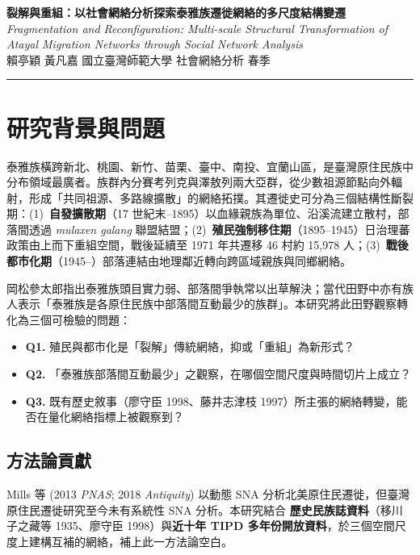 \documentclass[11pt,a4paper]{article}
\title{}
\author{}
\date{}
\begin{document}
\begin{center}
  {\LARGE\bfseries 裂解與重組：以社會網絡分析探索泰雅族遷徙網絡的多尺度結構變遷}\\[4pt]
  {\small\itshape Fragmentation and Reconfiguration: Multi-scale Structural Transformation of\\Atayal Migration Networks through Social Network Analysis}\\[6pt]
  {\small 賴亭穎 \textbar{} 黃凡嘉 \quad\textbar\quad 國立臺灣師範大學 社會網絡分析 \quad\textbar{} 春季}
\end{center}
\vspace{-4pt}\hrule\vspace{4pt}

\section{研究背景與問題}
泰雅族橫跨新北、桃園、新竹、苗栗、臺中、南投、宜蘭山區，是臺灣原住民族中分布領域最廣者。族群內分賽考列克與澤敖列兩大亞群，從少數祖源節點向外輻射，形成「共同祖源、多路線擴散」的網絡拓撲。其遷徙史可分為三個結構性斷裂期：(1)~\textbf{自發擴散期}（17 世紀末--1895）以血緣親族為單位、沿溪流建立散村，部落間透過 \textit{mulaxen galang} 聯盟結盟；(2)~\textbf{殖民強制移住期}（1895--1945）日治理蕃政策由上而下重組空間，戰後延續至 1971 年共遷移 46 村約 15{,}978 人；(3)~\textbf{戰後都市化期}（1945--）部落連結由地理鄰近轉向跨區域親族與同鄉網絡。

岡松參太郎指出泰雅族頭目實力弱、部落間爭執常以出草解決；當代田野中亦有族人表示「泰雅族是各原住民族中部落間互動最少的族群」。本研究將此田野觀察轉化為三個可檢驗的問題：

\vspace{-2pt}
\begin{itemize}
\item \textbf{Q1.} 殖民與都市化是「裂解」傳統網絡，抑或「重組」為新形式？
\item \textbf{Q2.} 「泰雅族部落間互動最少」之觀察，在哪個空間尺度與時間切片上成立？
\item \textbf{Q3.} 既有歷史敘事（廖守臣 1998、藤井志津枝 1997）所主張的網絡轉變，能否在量化網絡指標上被觀察到？
\end{itemize}

\subsection*{方法論貢獻}
Mills 等 (2013 \emph{PNAS}; 2018 \emph{Antiquity}) 以動態 SNA 分析北美原住民遷徙，但臺灣原住民遷徙研究至今未有系統性 SNA 分析。本研究結合 \textbf{歷史民族誌資料}（移川子之藏等 1935、廖守臣 1998）與\textbf{近十年 TIPD 多年份開放資料}，於三個空間尺度上建構互補的網絡，補上此一方法論空白。
\end{document}
